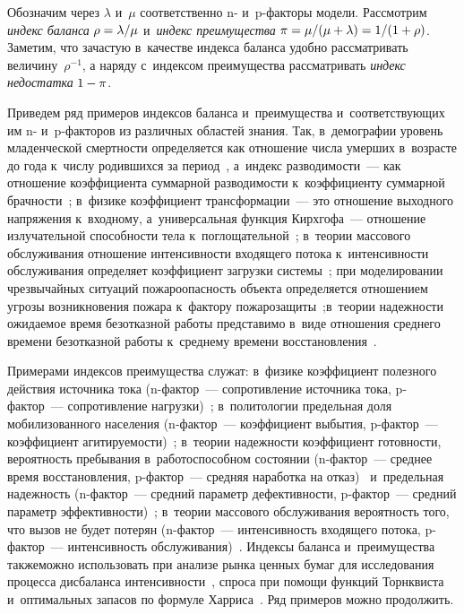 \begin{multicols}{2}
Обозначим через $\lambda$ и~$\mu$ соответственно n- и~\mbox{p-фак}\-то\-ры модели. 
Рассмотрим {\it индекс баланса} $\rho\hm=\lambda/\mu$ и~{\it индекс преимущества}
 $\pi\hm=\mu/(\mu\hm+\lambda)\hm=1/(1\hm+\rho)$. Заметим, что зачастую в~качестве 
 индекса баланса удобно рассматривать величину~$\rho^{-1}$, а наряду с~индексом 
 преимущества рассматривать {\it индекс недостатка} $1\hm-\pi$.

Приведем ряд примеров индексов  баланса и~преимущества и~соответствующих им n- 
и~p-фак\-то\-ров из различных областей знания. Так, в~демографии уровень 
младенческой смертности определяется как отношение числа умерших в~возрасте 
до года к~числу родившихся за период~\cite{Borisov2001}, а~индекс разводимости~--- 
как отношение коэффициента суммарной разводимости к~коэффициенту суммарной 
брач\-ности~\cite{Rybako2005}; в~физике коэффициент трансформации~--- 
это отношение выходного напряжения к~входному, а~универсальная функция Кирхгофа~--- 
отношение излучательной способности тела к~поглощательной~\cite{KuzRog2012}; 
в~тео\-рии массового обслуживания отношение интенсивности входящего потока\linebreak 
к~ин\-тен\-сив\-ности об\-слу\-жи\-ва\-ния определяет коэффициент загрузки 
сис\-те\-мы~\cite{BoPe1995}; при моделировании чрезвычайных ситуаций 
пожароопасность\linebreak
 объекта определяется отношением угрозы возникновения 
пожара к~фактору пожарозащиты~\cite{ShaRaSha2010};\linebreak в~тео\-рии на\-деж\-ности 
ожидаемое время безотказной работы представимо в~виде отношения среднего 
времени безотказной работы к~среднему времени вос\-ста\-нов\-ле\-ния~\cite{ZdRo2004}.

Примерами индексов преимущества служат: в~физике 
коэффициент полезного действия источника тока (n-фак\-тор~--- 
сопротивление источника тока, p-фак\-тор~--- сопротивление нагрузки)~\cite{KuzRog2012}; 
в~политологии предельная доля мобилизованного населения (n-фак\-тор~--- 
коэффициент выбытия, p-фак\-тор~--- коэффициент агитируемости)~\cite{ShiCh2004}; 
в~тео\-рии на\-деж\-ности коэффициент го\-тов\-ности, вероятность пребывания 
в~работоспособном со\-сто\-янии (\mbox{n-фак}\-тор~--- 
среднее время восстановления, \mbox{p-фак}\-тор~--- средняя наработка на 
отказ)~\cite{Kozlov1970,Gost27,ZdRo2004} и~предельная на\-деж\-ность 
(\mbox{n-фак}\-тор~--- сред\-ний параметр дефективности, \mbox{p-фак}\-тор~--- 
средний параметр эффективности)~\cite{KS2006}; 
в~тео\-рии массового обслуживания вероятность того, что вызов не будет потерян 
(n-фак\-тор~--- интенсивность входящего потока, \mbox{p-фак}\-тор~--- 
интенсивность обслуживания)~\cite{IKK1982}.
Индексы баланса и~преимущества также\linebreak можно использовать при анализе рынка ценных\linebreak 
бумаг для исследования процесса дисбаланса интенсивности~\cite{KChKZ2015}, спроса 
при помощи функций Торнквиста и~оптимальных запасов по формуле 
Харриса~\cite{ShiCh2004}. 
%
Ряд примеров можно продолжить.


\end{multicols}
